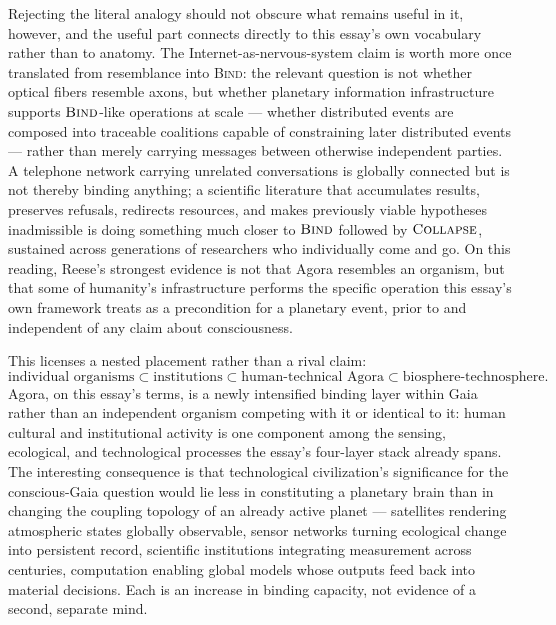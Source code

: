 \documentclass[11pt]{article}
\newcommand{\Bind}{\textsc{Bind}}
\newcommand{\Collapse}{\textsc{Collapse}}
\begin{document}
Rejecting the literal analogy should not obscure what remains useful in it, however, and the useful part connects directly to this essay's own vocabulary rather than to anatomy. The Internet-as-nervous-system claim is worth more once translated from resemblance into \Bind: the relevant question is not whether optical fibers resemble axons, but whether planetary information infrastructure supports $\Bind$-like operations at scale --- whether distributed events are composed into traceable coalitions capable of constraining later distributed events --- rather than merely carrying messages between otherwise independent parties. A telephone network carrying unrelated conversations is globally connected but is not thereby binding anything; a scientific literature that accumulates results, preserves refusals, redirects resources, and makes previously viable hypotheses inadmissible is doing something much closer to $\Bind$ followed by $\Collapse$, sustained across generations of researchers who individually come and go. On this reading, Reese's strongest evidence is not that Agora resembles an organism, but that some of humanity's infrastructure performs the specific operation this essay's own framework treats as a precondition for a planetary event, prior to and independent of any claim about consciousness.

This licenses a nested placement rather than a rival claim:
\[
\text{individual organisms} \subset \text{institutions} \subset \text{human-technical Agora} \subset \text{biosphere-technosphere}.
\]
Agora, on this essay's terms, is a newly intensified binding layer within Gaia rather than an independent organism competing with it or identical to it: human cultural and institutional activity is one component among the sensing, ecological, and technological processes the essay's four-layer stack already spans. The interesting consequence is that technological civilization's significance for the conscious-Gaia question would lie less in constituting a planetary brain than in changing the coupling topology of an already active planet --- satellites rendering atmospheric states globally observable, sensor networks turning ecological change into persistent record, scientific institutions integrating measurement across centuries, computation enabling global models whose outputs feed back into material decisions. Each is an increase in binding capacity, not evidence of a second, separate mind.
\end{document}
